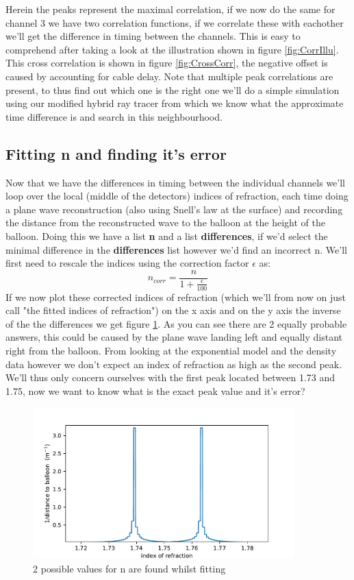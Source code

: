 \documentclass[11pt,a4paper,faculty=we,language=en,doctype=report]{cls/ugent-doc}
\begin{document}
Herein the peaks represent the maximal correlation, if we now do the same for
channel 3 we have two correlation functions, if we correlate these with
eachother we'll get the difference in timing between the channels.  This is
easy to comprehend after taking a look at the illustration shown in figure
\ref{fig:CorrIllu}. This cross correlation is shown in figure
\ref{fig:CrossCorr}, the negative offset is caused by accounting for cable
delay. Note that multiple peak correlations are present, to thus find out which
one is the right one we'll do a simple simulation using our modified hybrid ray
tracer from which we know what the approximate time difference is and search in
this neighbourhood.

\subsection{Fitting n and finding it's error}
Now that we have the differences in timing between the individual channels we'll loop
over the local (middle of the detectors) indices of refraction, each time doing a plane
wave reconstruction (also using Snell's law at the surface) and recording the distance
from the reconstructed wave to the balloon at the height of the balloon.
Doing this we have a list \textbf{n} and a list \textbf{differences}, if we'd select
the minimal difference in the \textbf{differences} list however we'd find an incorrect
n. We'll first need to rescale the indices using the correction factor $\epsilon$ as:
\begin{equation}
	n_{corr} = \frac{n}{1+\frac{\epsilon}{100}}
\end{equation}
If we now plot these corrected indices of refraction (which we'll from now on
just call "the fitted indices of refraction") on the x axis and on the y axis
the inverse of the the differences we get figure \ref{fig:2PeakFit}. As you can
see there are 2 equally probable answers, this could be caused by the plane
wave landing left and equally distant right from the balloon. From looking at
the exponential model and the density data however we don't expect an index of
refraction as high as the second peak. We'll thus only concern ourselves with
the first peak located between 1.73 and 1.75, now we want to know what is the
exact peak value and it's error?
\begin{figure}
	\centering
	\includegraphics[width=0.9\textwidth]{TryingToFindn.pdf}
	\caption{2 possible values for n are found whilst fitting}
	\label{fig:2PeakFit}
\end{figure}
\end{document}
